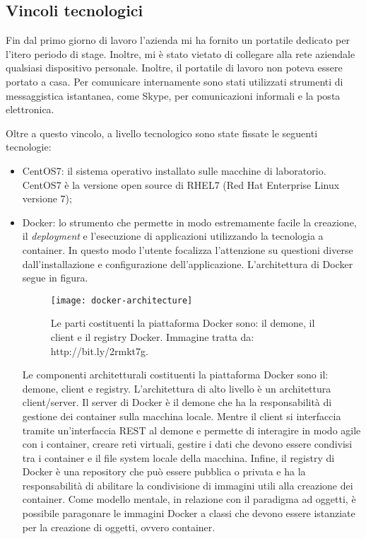 \subsection{Vincoli tecnologici}

Fin dal primo giorno di lavoro l'azienda mi ha fornito un portatile dedicato per l'itero periodo di stage. Inoltre, mi è stato vietato di collegare alla rete aziendale qualsiasi dispositivo personale. Inoltre, il portatile di lavoro non poteva essere portato a casa.
Per comunicare internamente sono stati utilizzati strumenti di messaggistica istantanea, come Skype, per comunicazioni informali e la posta elettronica.

Oltre a questo vincolo, a livello tecnologico sono state fissate le seguenti tecnologie:

\begin{itemize}
	\item CentOS7: il sistema operativo installato sulle macchine di laboratorio. CentOS7 è la versione open source di RHEL7 (Red Hat Enterprise Linux versione 7);
	\item Docker: lo strumento che permette in modo estremamente facile la creazione, il \textit{deployment} e l'esecuzione di applicazioni utilizzando la tecnologia a container. In questo modo l'utente focalizza l'attenzione su questioni diverse dall'installazione e configurazione dell'applicazione. 
	L'architettura di Docker segue in figura. 
	
	\begin{figure}[htbp]
		\begin{center}
			\texttt{[image: docker-architecture]}
			\caption{Le parti costituenti la piattaforma Docker sono: il demone, il client e il registry Docker. Immagine tratta da: http://bit.ly/2rmkt7g.}
		\end{center}
	\end{figure}
	
	Le componenti architetturali costituenti la piattaforma Docker sono il:
	demone, client e registry. L'architettura di alto livello è 
	un architettura client/server. Il server di Docker è il demone che ha la responsabilità di gestione dei container sulla macchina locale. Mentre il client si interfaccia tramite un'interfaccia REST al demone e permette di interagire in modo agile con i container, creare reti virtuali, gestire i dati che devono essere condivisi tra i container e il file system locale della macchina. Infine, il registry di Docker è una repository che può essere pubblica o privata e ha la responsabilità di abilitare la condivisione di immagini utili alla creazione dei container. Come modello mentale, in relazione con il paradigma ad oggetti, è possibile paragonare le immagini Docker a classi che devono essere istanziate per la creazione di oggetti, ovvero container. 
	

\end{itemize}
